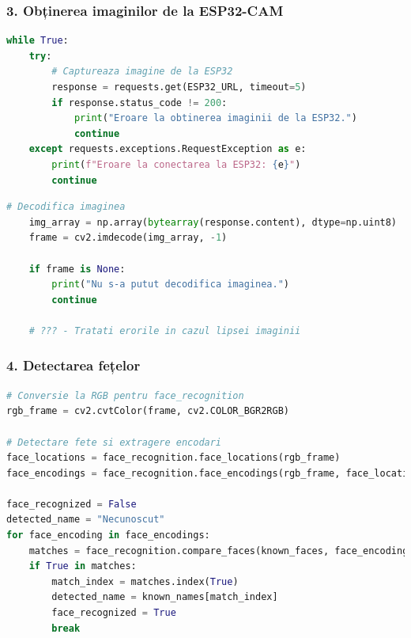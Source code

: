\documentclass{report}
\begin{document}
\subsubsection{3. Obținerea imaginilor de la ESP32-CAM}
\begin{lstlisting}[language=Python]
while True:
    try:
        # Captureaza imagine de la ESP32
        response = requests.get(ESP32_URL, timeout=5)
        if response.status_code != 200:
            print("Eroare la obtinerea imaginii de la ESP32.")
            continue
    except requests.exceptions.RequestException as e:
        print(f"Eroare la conectarea la ESP32: {e}")
        continue
\end{lstlisting}
\newpage
\vspace*{1cm}
\begin{lstlisting}[language=Python]
    # Decodifica imaginea
    img_array = np.array(bytearray(response.content), dtype=np.uint8)
    frame = cv2.imdecode(img_array, -1)

    if frame is None:
        print("Nu s-a putut decodifica imaginea.")
        continue

    # ??? - Tratati erorile in cazul lipsei imaginii
\end{lstlisting}


\subsubsection{4. Detectarea fețelor}
\begin{lstlisting}[language=Python]
# Conversie la RGB pentru face_recognition
rgb_frame = cv2.cvtColor(frame, cv2.COLOR_BGR2RGB)

# Detectare fete si extragere encodari
face_locations = face_recognition.face_locations(rgb_frame)
face_encodings = face_recognition.face_encodings(rgb_frame, face_locations)

face_recognized = False
detected_name = "Necunoscut"
for face_encoding in face_encodings:
    matches = face_recognition.compare_faces(known_faces, face_encoding, tolerance=???)
    if True in matches:
        match_index = matches.index(True)
        detected_name = known_names[match_index]
        face_recognized = True
        break
\end{lstlisting}
\end{document}
